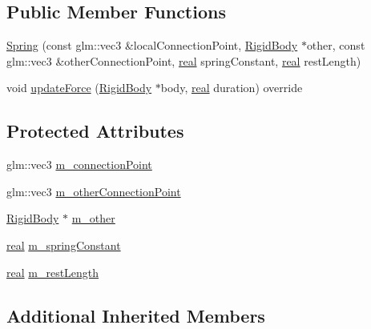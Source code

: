 \subsection*{Public Member Functions}
\begin{DoxyCompactItemize}
\item 
\mbox{\hyperlink{classrum_1_1_spring_a2277a63f256766c6f92a6a7e1d505273}{Spring}} (const glm\+::vec3 \&local\+Connection\+Point, \mbox{\hyperlink{classrum_1_1_rigid_body}{Rigid\+Body}} $\ast$other, const glm\+::vec3 \&other\+Connection\+Point, \mbox{\hyperlink{namespacerum_a7e8cca23573d5eaead0f138cbaa4862c}{real}} spring\+Constant, \mbox{\hyperlink{namespacerum_a7e8cca23573d5eaead0f138cbaa4862c}{real}} rest\+Length)
\item 
void \mbox{\hyperlink{classrum_1_1_spring_a31f5e48beb95ebc394ff2cb1dd813708}{update\+Force}} (\mbox{\hyperlink{classrum_1_1_rigid_body}{Rigid\+Body}} $\ast$body, \mbox{\hyperlink{namespacerum_a7e8cca23573d5eaead0f138cbaa4862c}{real}} duration) override
\end{DoxyCompactItemize}
\subsection*{Protected Attributes}
\begin{DoxyCompactItemize}
\item 
glm\+::vec3 \mbox{\hyperlink{classrum_1_1_spring_a182a3c508405acaa78d0d69131762184}{m\+\_\+connection\+Point}}
\item 
glm\+::vec3 \mbox{\hyperlink{classrum_1_1_spring_a79133430ee2006e38131dc8d0942df4b}{m\+\_\+other\+Connection\+Point}}
\item 
\mbox{\hyperlink{classrum_1_1_rigid_body}{Rigid\+Body}} $\ast$ \mbox{\hyperlink{classrum_1_1_spring_ae4ab596b13dc5ea550b6025fe8eaaf43}{m\+\_\+other}}
\item 
\mbox{\hyperlink{namespacerum_a7e8cca23573d5eaead0f138cbaa4862c}{real}} \mbox{\hyperlink{classrum_1_1_spring_a820806622160bcdd02d756a1cabadc20}{m\+\_\+spring\+Constant}}
\item 
\mbox{\hyperlink{namespacerum_a7e8cca23573d5eaead0f138cbaa4862c}{real}} \mbox{\hyperlink{classrum_1_1_spring_a78a5d56210e733d7bb92e02a98ee4d49}{m\+\_\+rest\+Length}}
\end{DoxyCompactItemize}
\subsection*{Additional Inherited Members}


